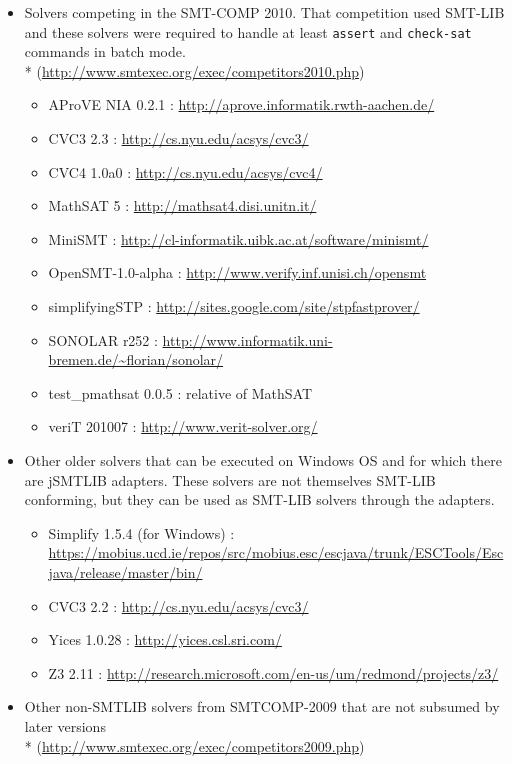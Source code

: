 \documentclass[12pt,oneside]{report}
\begin{document}
\begin{itemize}
\item Solvers competing in the SMT-COMP 2010.  That competition used SMT-LIB and these solvers were required to handle at least {\tt assert} and {\tt check-sat} commands in batch mode.\\*
 (\url{http://www.smtexec.org/exec/competitors2010.php})
\begin{itemize}
\item AProVE NIA 0.2.1 : \url{http://aprove.informatik.rwth-aachen.de/}
\item CVC3 2.3  : \url{http://cs.nyu.edu/acsys/cvc3/}
\item CVC4 1.0a0 : \url{http://cs.nyu.edu/acsys/cvc4/}
\item MathSAT 5 : \url{http://mathsat4.disi.unitn.it/}
\item MiniSMT : \url{http://cl-informatik.uibk.ac.at/software/minismt/}
\item OpenSMT-1.0-alpha : \url{http://www.verify.inf.unisi.ch/opensmt}
\item simplifyingSTP : \url{http://sites.google.com/site/stpfastprover/}
\item SONOLAR r252 : \url{http://www.informatik.uni-bremen.de/~florian/sonolar/}
\item test\_pmathsat 0.0.5 : relative of MathSAT
\item veriT 201007 : \url{http://www.verit-solver.org/}
\end{itemize}
\item Other older solvers that can be executed on Windows OS and for which there are jSMTLIB adapters.  These solvers are not themselves SMT-LIB conforming, but they can be used as SMT-LIB solvers through the adapters.
\begin{itemize}
\item Simplify 1.5.4 (for Windows) : \url{https://mobius.ucd.ie/repos/src/mobius.esc/escjava/trunk/ESCTools/Escjava/release/master/bin/}
\item CVC3 2.2 : \url{http://cs.nyu.edu/acsys/cvc3/}
\item Yices 1.0.28 : \url{http://yices.csl.sri.com/}
\item Z3 2.11 : \url{http://research.microsoft.com/en-us/um/redmond/projects/z3/}
\end{itemize}
\item Other non-SMTLIB solvers from SMTCOMP-2009 that are not subsumed by later versions\\*
 (\url{http://www.smtexec.org/exec/competitors2009.php})

\end{itemize}
\end{document}
